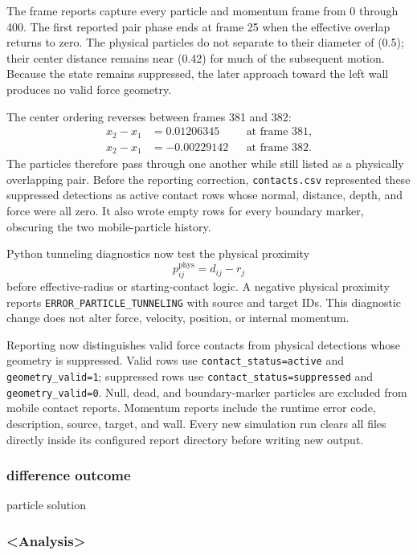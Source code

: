 The frame reports capture every particle and momentum frame from 0 through
400.  The first reported pair phase ends at frame 25 when the effective
overlap returns to zero.  The physical particles do not separate to their
diameter of (0.5); their center distance remains near (0.42) for much of
the subsequent motion.  Because the state remains suppressed, the later
approach toward the left wall produces no valid force geometry.

The center ordering reverses between frames 381 and 382:
\begin{align}
x_2-x_1 &= 0.01206345 && \text{at frame 381},\\
x_2-x_1 &=-0.00229142 && \text{at frame 382}.
\end{align}
The particles therefore pass through one another while still listed as a
physically overlapping pair.  Before the reporting correction,
\texttt{contacts.csv} represented these suppressed detections as active
contact rows whose normal, distance, depth, and force were all zero.  It also
wrote empty rows for every boundary marker, obscuring the two mobile-particle
history.

Python tunneling diagnostics now test the physical proximity
\begin{equation}
p_{ij}^{\mathrm{phys}}=d_{ij}-r_j
\end{equation}
before effective-radius or starting-contact logic.  A negative physical
proximity reports \texttt{ERROR\_PARTICLE\_TUNNELING} with source and target
IDs.  This diagnostic change does not alter force, velocity, position, or
internal momentum.

Reporting now distinguishes valid force contacts from physical detections
whose geometry is suppressed.  Valid rows use
\texttt{contact\_status=active} and \texttt{geometry\_valid=1}; suppressed
rows use \texttt{contact\_status=suppressed} and
\texttt{geometry\_valid=0}.  Null, dead, and boundary-marker particles are
excluded from mobile contact reports.  Momentum reports include the runtime
error code, description, source, target, and wall.  Every new simulation run
clears all files directly inside its configured report directory before
writing new output.

\subsubsection{difference outcome}

particle solution

\subsubsection{<Analysis>}

